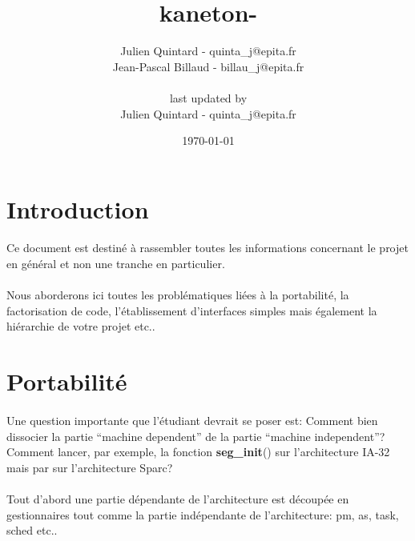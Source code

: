 \documentclass[10pt,a4wide]{article}
\title{kaneton-\ng}
\author{Julien Quintard - \small{quinta\_j@epita.fr} \\
        Jean-Pascal Billaud - \small{billau\_j@epita.fr} \\ \\
	\small{last updated by} \\
	Julien Quintard - \small{quinta\_j@epita.fr}}
\date{\today}
\begin{document}
\maketitle

\section{Introduction}

\paragraph{}

Ce document est destin\'e \`a rassembler toutes les informations concernant
le projet en g\'en\'eral et non une tranche en particulier.

\paragraph{}

Nous aborderons ici toutes les probl\'ematiques li\'ees \`a la portabilit\'e,
la factorisation de code, l'\'etablissement d'interfaces simples mais
\'egalement la hi\'erarchie de votre projet etc..

\section{Portabilit\'e}

\paragraph{}

Une question importante que l'\'etudiant devrait se poser est:
Comment bien dissocier la partie ``machine dependent'' de la partie
``machine independent''? Comment lancer, par exemple, la fonction
\textbf{seg\_init}() sur l'architecture IA-32 mais par sur l'architecture
Sparc?

\paragraph{}

Tout d'abord une partie d\'ependante de l'architecture est d\'ecoup\'ee en
gestionnaires tout comme la partie ind\'ependante de l'architecture: pm, as,
task, sched etc..

\paragraph{}
\end{document}
